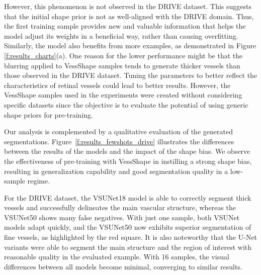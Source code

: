 \documentclass[%
reprint,
nofootinbib,
 amsmath,amssymb,
aps,
superscriptaddress,
showkeys,
longbibliography
]{revtex4-1}
\begin{document}
However, this phenomenon is not observed in the DRIVE dataset. This suggests that the initial shape prior is not as well-aligned with the DRIVE domain. Thus, the first training sample provides new and valuable information that helps the model adjust its weights in a beneficial way, rather than causing overfitting. Similarly, the model also benefits from more examples, as demonstrated in Figure \ref{f:results_charts}(a). One reason for the lower performance might be that the blurring applied to VessShape samples tends to generate thicker vessels than those observed in the DRIVE dataset. Tuning the parameters to better reflect the characteristics of retinal vessels could lead to better results. However, the VessShape samples used in the experiments were created without considering specific datasets since the objective is to evaluate the potential of using generic shape priors for pre-training.

Our analysis is complemented by a qualitative evaluation of the generated segmentations. Figure~\ref{f:results_fewshots_drive} illustrates the differences between the results of the models and the impact of the shape bias. We observe the effectiveness of pre-training with VessShape in instilling a strong shape bias, resulting in generalization capability and good segmentation quality in a low-sample regime.

For the DRIVE dataset, the VSUNet18 model is able to correctly segment thick vessels and successfully delineates the main vascular structure, whereas the VSUNet50 shows many false negatives. With just one sample, both VSUNet models adapt quickly, and the VSUNet50 now exhibits superior segmentation of fine vessels, as highlighted by the red square. It is also noteworthy that the U-Net variants were able to segment the main structure and the region of interest with reasonable quality in the evaluated example. With 16 samples, the visual differences between all models become minimal, converging to similar results.
\end{document}

